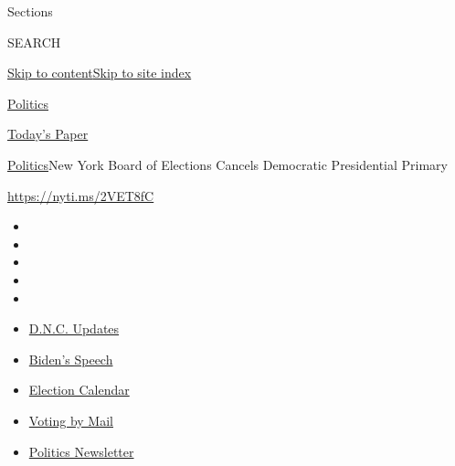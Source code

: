 Sections

SEARCH

\protect\hyperlink{site-content}{Skip to
content}\protect\hyperlink{site-index}{Skip to site index}

\href{https://www.nytimes3xbfgragh.onion/section/politics}{Politics}

\href{https://myaccount.nytimes3xbfgragh.onion/auth/login?response_type=cookie\&client_id=vi}{}

\href{https://www.nytimes3xbfgragh.onion/section/todayspaper}{Today's
Paper}

\href{/section/politics}{Politics}\textbar{}New York Board of Elections
Cancels Democratic Presidential Primary

\url{https://nyti.ms/2VET8fC}

\begin{itemize}
\item
\item
\item
\item
\item
\end{itemize}

\begin{itemize}
\item
  \href{https://www.nytimes3xbfgragh.onion/live/2020/08/20/us/dnc-convention-election?action=click\&pgtype=Article\&state=default\&region=TOP_BANNER\&context=storylines_menu}{D.N.C.
  Updates}
\item
  \href{https://www.nytimes3xbfgragh.onion/2020/08/20/us/politics/biden-presidential-nomination-dnc.html?action=click\&pgtype=Article\&state=default\&region=TOP_BANNER\&context=storylines_menu}{Biden's
  Speech}
\item
  \href{https://www.nytimes3xbfgragh.onion/interactive/2019/us/elections/2020-presidential-election-calendar.html?action=click\&pgtype=Article\&state=default\&region=TOP_BANNER\&context=storylines_menu}{Election
  Calendar}
\item
  \href{https://www.nytimes3xbfgragh.onion/interactive/2020/08/11/us/politics/vote-by-mail-us-states.html?action=click\&pgtype=Article\&state=default\&region=TOP_BANNER\&context=storylines_menu}{Voting
  by Mail}
\item
  \href{https://www.nytimes3xbfgragh.onion/newsletters/politics?action=click\&pgtype=Article\&state=default\&region=TOP_BANNER\&context=storylines_menu}{Politics
  Newsletter}
\end{itemize}

